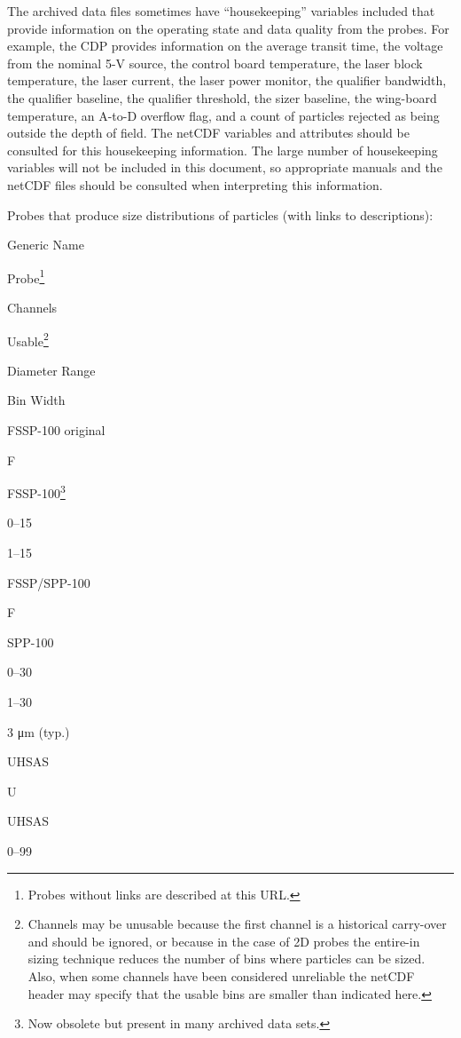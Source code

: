 \documentclass[
  english,
]{book}
\begin{document}
The archived data files sometimes have ``housekeeping'' variables included that provide information on the operating state and data quality from the probes. For example, the CDP provides information on the average transit time, the voltage from the nominal 5-V source, the control board temperature, the laser block temperature, the laser current, the laser power monitor, the qualifier bandwidth, the qualifier baseline, the qualifier threshold, the sizer baseline, the wing-board temperature, an A-to-D overflow flag, and a count of particles rejected as being outside the depth of field. The netCDF variables and attributes should be consulted for this housekeeping information. The large number of housekeeping variables will not be included in this document, so appropriate manuals and the netCDF files should be consulted when interpreting this information.

Probes that produce size distributions of particles (with links to descriptions):\protect\hypertarget{TableOfProbes}{}{}

Generic Name

Probe\footnote{Probes without links are described at this URL.}

Channels

Usable\footnote{Channels may be unusable because the first channel is a historical carry-over and should be ignored, or because in the case of 2D probes the entire-in sizing technique reduces the number of bins where particles can be sized. Also, when some channels have been considered unreliable the netCDF header may specify that the usable bins are smaller than indicated here.}

Diameter Range

Bin Width

{FSSP-100 original}

{F}

{FSSP-100}\footnote{Now obsolete but present in many archived data sets.}

{0--15}

{1--15}

FSSP/SPP-100

F

SPP-100

0--30

1--30

3 {μ}m (typ.)

UHSAS

U

UHSAS

0--99
\end{document}
